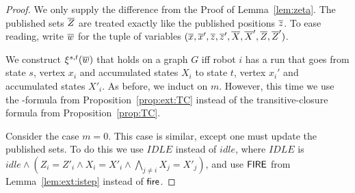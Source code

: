 \begin{proof}
We only supply the difference from the Proof of Lemma~\ref{lem:zeta}.
The published sets $\overline{Z}$ are treated exactly like the published positions $\overline{z}$. To ease reading, write $\overline{w}$ for the tuple of variables
$(\overline{x},\overline{x}',\overline{z},\overline{z}',\overline{X},\overline{X}',\overline{Z},\overline{Z}')$.

We construct $\xi^{s,t}(\overline{w})$ that holds on a graph $G$ iff
 robot $i$ has a run that goes from state $s$, vertex $x_i$ and accumulated states $X_i$ to state $t$, vertex $x_i'$ and accumulated states $X'_i$.
As before, we induct on $m$.
However, this time we use the \msol-formula from Proposition~\ref{prop:ext:TC} instead of the transitive-closure formula from Proposition~\ref{prop:TC}.

Consider the case $m = 0$. This case is similar, except one must update the published sets. To do this we use $IDLE$ instead of $idle$, where $IDLE$ is
$idle \wedge (Z_i = Z'_i \wedge X_i = X'_i \wedge \bigwedge_{j \neq i} X_j = X'_j)$, and use $\mathsf{FIRE}$ from Lemma~\ref{lem:ext:istep} instead of $\mathsf{fire}$.








\end{proof}
